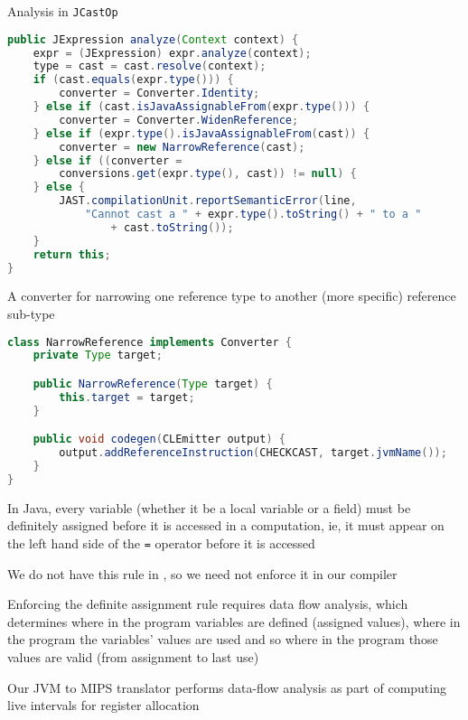 \documentclass[8pt,a4paper,compress]{beamer}
\begin{document}
\begin{frame}[fragile]
\pause

Analysis in \lstinline{JCastOp}

\begin{lstlisting}[language=Java]
public JExpression analyze(Context context) {
    expr = (JExpression) expr.analyze(context);
    type = cast = cast.resolve(context);
    if (cast.equals(expr.type())) {
        converter = Converter.Identity;
    } else if (cast.isJavaAssignableFrom(expr.type())) {
        converter = Converter.WidenReference;
    } else if (expr.type().isJavaAssignableFrom(cast)) {
        converter = new NarrowReference(cast);
    } else if ((converter =
        conversions.get(expr.type(), cast)) != null) {
    } else {
        JAST.compilationUnit.reportSemanticError(line,
            "Cannot cast a " + expr.type().toString() + " to a "
                + cast.toString());
    }
    return this;
}
\end{lstlisting}

\pause
\bigskip

A converter for narrowing one reference type to another (more specific) reference sub-type
\begin{lstlisting}[language=Java]
class NarrowReference implements Converter {
    private Type target;

    public NarrowReference(Type target) {
        this.target = target;
    }

    public void codegen(CLEmitter output) {
        output.addReferenceInstruction(CHECKCAST, target.jvmName());
    }
}
\end{lstlisting}
\end{frame}

\begin{frame}[fragile]
\pause

In Java, every variable (whether it be a local variable or a field) must be definitely assigned before it is accessed in a computation, ie, it must appear on the left hand side of the \lstinline{=} operator before it is accessed

\pause
\bigskip

We do not have this rule in  \jmm, so we need not enforce it in our compiler

\pause
\bigskip

Enforcing the definite assignment rule requires data flow analysis, which determines where in the program variables are defined (assigned values), where in the program the variables' values are used and so where in the program those values are valid (from assignment to last use)

\pause
\bigskip

Our JVM to MIPS translator performs data-flow analysis as part of computing live intervals for register allocation
\end{frame}
\end{document}
